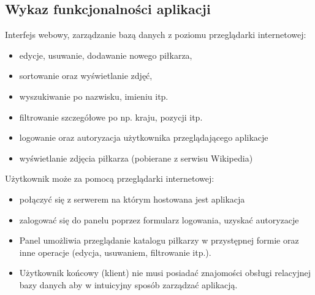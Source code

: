 \subsection{Wykaz funkcjonalności aplikacji}
    \begin{flushleft}
        Interfejs webowy, zarządzanie bazą danych z poziomu przeglądarki internetowej:

        \begin{itemize}
            \item edycje, usuwanie, dodawanie nowego piłkarza,
            \item sortowanie oraz wyświetlanie zdjęć,
            \item wyszukiwanie po nazwisku, imieniu itp.
            \item filtrowanie szczegółowe po np. kraju, pozycji itp.
            \item logowanie oraz autoryzacja użytkownika przeglądającego aplikacje
            \item wyświetlanie zdjęcia piłkarza (pobierane z serwisu Wikipedia)\newline\newline
        \end{itemize}


         Użytkownik może za pomocą przeglądarki internetowej:
        \begin{itemize}
            \item  połączyć się z serwerem na którym hostowana jest aplikacja
            \item zalogować się do panelu poprzez formularz logowania, uzyskać autoryzacje
            \item Panel umożliwia przeglądanie katalogu  piłkarzy w przystępnej formie oraz inne operacje (edycja, usuwaniem, filtrowanie itp.).
            \item Użytkownik końcowy (klient) nie musi posiadać znajomości obsługi relacyjnej bazy danych aby w intuicyjny sposób zarządzać aplikacją.
        \end{itemize}


    \end{flushleft}
    \pagebreak

